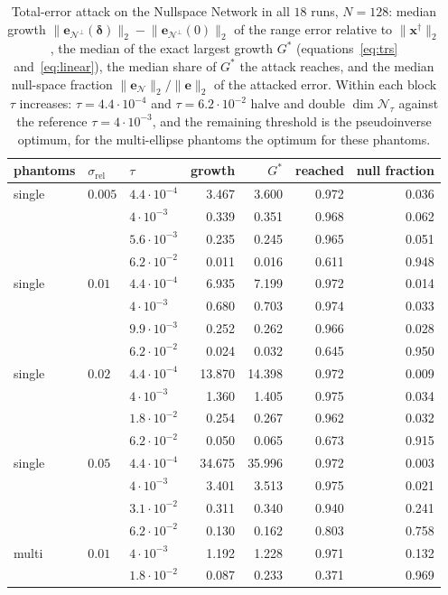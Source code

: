 \documentclass{article}
\numberwithin{equation}{section}
\begin{document}
\begin{table}[htbp]
\centering
\caption{Total-error attack on the Nullspace Network in all $18$ runs, $N=128$: median growth
$\lVert\mathbf{e}_{\mathcal{N}^\perp}(\boldsymbol{\delta})\rVert_2-\lVert\mathbf{e}_{\mathcal{N}^\perp}(0)\rVert_2$
of the range error relative to $\lVert\mathbf{x}^\dagger\rVert_2$, the median of the exact largest growth
$G^*$ (equations~\eqref{eq:trs} and~\eqref{eq:linear}), the median share of $G^*$ the attack reaches,
and the median null-space fraction $\lVert\mathbf{e}_\mathcal{N}\rVert_2/\lVert\mathbf{e}\rVert_2$ of the
attacked error. Within each block $\tau$ increases: $\tau=4.4\cdot10^{-4}$ and $\tau=6.2\cdot10^{-2}$ halve
and double $\dim\mathcal{N}_\tau$ against the reference $\tau=4\cdot10^{-3}$, and the remaining threshold
is the pseudoinverse optimum, for the multi-ellipse phantoms the optimum for these phantoms.}\label{tab:prop}
\small\setlength{\tabcolsep}{4pt}
\begin{tabular}{l l l rrr r}
\toprule
phantoms & $\sigma_\text{rel}$ & $\tau$ & growth & $G^*$ & reached & null fraction \\
\midrule
single & $0.005$ & $4.4\cdot10^{-4}$ & 3.467 & 3.600 & 0.972 & 0.036 \\
       &         & $4\cdot10^{-3}$   & 0.339 & 0.351 & 0.968 & 0.062 \\
       &         & $5.6\cdot10^{-3}$ & 0.235 & 0.245 & 0.965 & 0.051 \\
       &         & $6.2\cdot10^{-2}$ & 0.011 & 0.016 & 0.611 & 0.948 \\
\midrule
single & $0.01$  & $4.4\cdot10^{-4}$ & 6.935 & 7.199 & 0.972 & 0.014 \\
       &         & $4\cdot10^{-3}$   & 0.680 & 0.703 & 0.974 & 0.033 \\
       &         & $9.9\cdot10^{-3}$ & 0.252 & 0.262 & 0.966 & 0.028 \\
       &         & $6.2\cdot10^{-2}$ & 0.024 & 0.032 & 0.645 & 0.950 \\
\midrule
single & $0.02$  & $4.4\cdot10^{-4}$ & 13.870 & 14.398 & 0.972 & 0.009 \\
       &         & $4\cdot10^{-3}$   & 1.360  & 1.405  & 0.975 & 0.034 \\
       &         & $1.8\cdot10^{-2}$ & 0.254  & 0.267  & 0.962 & 0.032 \\
       &         & $6.2\cdot10^{-2}$ & 0.050  & 0.065  & 0.673 & 0.915 \\
\midrule
single & $0.05$  & $4.4\cdot10^{-4}$ & 34.675 & 35.996 & 0.972 & 0.003 \\
       &         & $4\cdot10^{-3}$   & 3.401  & 3.513  & 0.975 & 0.021 \\
       &         & $3.1\cdot10^{-2}$ & 0.311  & 0.340  & 0.940 & 0.241 \\
       &         & $6.2\cdot10^{-2}$ & 0.130  & 0.162  & 0.803 & 0.758 \\
\midrule
multi  & $0.01$  & $4\cdot10^{-3}$   & 1.192 & 1.228 & 0.971 & 0.132 \\
       &         & $1.8\cdot10^{-2}$ & 0.087 & 0.233 & 0.371 & 0.969 \\
\bottomrule
\end{tabular}
\end{table}
\end{document}
